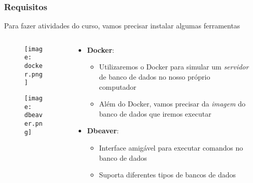 \documentclass[t, 10pt, aspectratio=169, table, x11names]{beamer}
\begin{document}
	\begin{frame}
		\frametitle{Requisitos}
		Para fazer atividades do curso, vamos precisar instalar algumas ferramentas
		\begin{columns}[t]
			\begin{column}{0.20\textwidth}
				\vspace{0.3cm}
				\begin{figure}[h]
					\texttt{[image: docker.png]}
				\end{figure}
				\vspace{1.1cm}
				\begin{figure}[h]
					\texttt{[image: dbeaver.png]}
				\end{figure}
			\end{column}

			\begin{column}{0.70\textwidth}
				\begin{itemize}
					\item \textbf{Docker}: \href{https://www.docker.com/products/docker-desktop/}{}
					
					\begin{itemize}
						\item Utilizaremos o Docker para simular um \textit{servidor} de banco de dados no nosso próprio computador
						\item Além do Docker, vamos precisar da \textit{imagem} do banco de dados que iremos executar
					\end{itemize}
					\vspace{0.4cm}
					\item \textbf{Dbeaver}: \href{https://dbeaver.io/download}{ }
					\begin{itemize}
						\item Interface amigável para executar comandos no banco de dados
						\item Suporta diferentes tipos de bancos de dados
					\end{itemize}
				\end{itemize}
			\end{column}
			\begin{column}{0.05\textwidth}
			\end{column}
		\end{columns}
	\end{frame}
	
\end{document}
